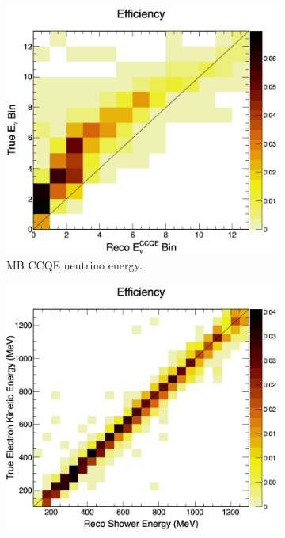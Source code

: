 \begin{figure}[H]
    \centering
    \begin{subfigure}{0.52\linewidth}
        \includegraphics[width=\linewidth]{technote/SignalModel/Figures/NuE_RecoTrue_Eff_2D.png}
        \caption{MB CCQE neutrino energy.}
    \end{subfigure}
    \begin{subfigure}{0.49\linewidth}
        \includegraphics[width=\linewidth]{technote/SignalModel/Figures/ShwKE_RecoTrue_Eff_2D.png}

\end{subfigure}
\end{figure}
